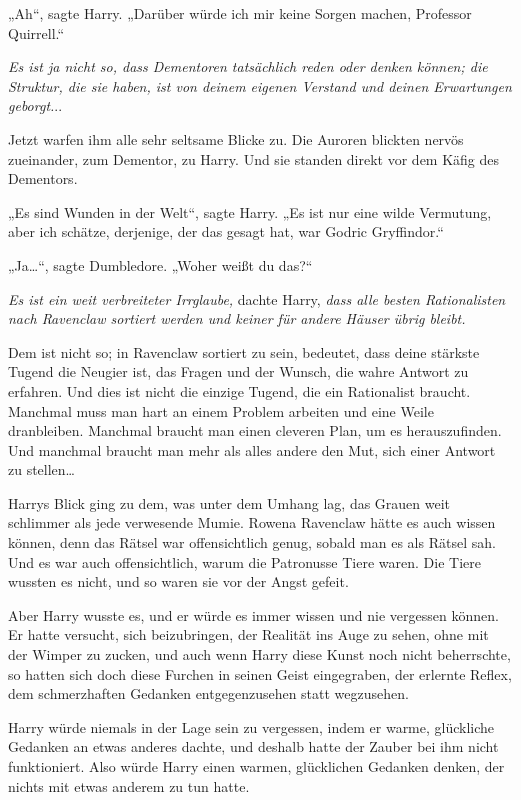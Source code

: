 {„Ah“, sagte Harry. „Darüber würde ich mir keine Sorgen machen, Professor Quirrell.“

\emph{Es ist ja nicht so, dass Dementoren tatsächlich reden oder denken können; die Struktur, die sie haben, ist von deinem eigenen Verstand und deinen Erwartungen geborgt.}..

Jetzt warfen ihm alle sehr seltsame Blicke zu. Die Auroren blickten nervös zueinander, zum Dementor, zu Harry. Und sie standen direkt vor dem Käfig des Dementors.

„Es sind Wunden in der Welt“, sagte Harry. „Es ist nur eine wilde Vermutung, aber ich schätze, derjenige, der das gesagt hat, war Godric Gryffindor.“

„Ja…“, sagte Dumbledore. „Woher weißt du das?“

\emph{Es ist ein weit verbreiteter Irrglaube,} dachte Harry, \emph{dass alle besten Rationalisten nach Ravenclaw sortiert werden und keiner für andere Häuser übrig bleibt.}

Dem ist nicht so; in Ravenclaw sortiert zu sein, bedeutet, dass deine stärkste Tugend die Neugier ist, das Fragen und der Wunsch, die wahre Antwort zu erfahren. Und dies ist nicht die einzige Tugend, die ein Rationalist braucht. Manchmal muss man hart an einem Problem arbeiten und eine Weile dranbleiben. Manchmal braucht man einen cleveren Plan, um es herauszufinden. Und manchmal braucht man mehr als alles andere den Mut, sich einer Antwort zu stellen…

Harrys Blick ging zu dem, was unter dem Umhang lag, das Grauen weit schlimmer als jede verwesende Mumie. Rowena Ravenclaw hätte es auch wissen können, denn das Rätsel war offensichtlich genug, sobald man es als Rätsel sah. Und es war auch offensichtlich, warum die Patronusse Tiere waren. Die Tiere wussten es nicht, und so waren sie vor der Angst gefeit.

Aber Harry wusste es, und er würde es immer wissen und nie vergessen können. Er hatte versucht, sich beizubringen, der Realität ins Auge zu sehen, ohne mit der Wimper zu zucken, und auch wenn Harry diese Kunst noch nicht beherrschte, so hatten sich doch diese Furchen in seinen Geist eingegraben, der erlernte Reflex, dem schmerzhaften Gedanken entgegenzusehen statt wegzusehen.

Harry würde niemals in der Lage sein zu vergessen, indem er warme, glückliche Gedanken an etwas anderes dachte, und deshalb hatte der Zauber bei ihm nicht funktioniert. Also würde Harry einen warmen, glücklichen Gedanken denken, der nichts mit etwas anderem zu tun hatte.

}
